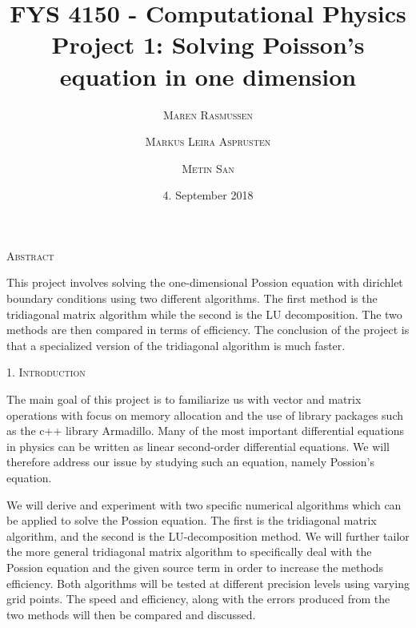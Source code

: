 \documentclass[a4paper,10pt]{article}
\title{FYS 4150 - Computational Physics\\
 Project 1: Solving Poisson's equation in one dimension 
}
\date{\normalsize{4. September 2018} }
\author{
 \textsc{\small{Maren Rasmussen}}\and \textsc{\small{Markus Leira Asprusten}}\and \textsc{\small{Metin San}}
 }
\begin{document}
\maketitle
\begin{center}
\textsc{Abstract}
\end{center}

\begin{adjustwidth}{7mm}{7mm}

This project involves solving the one-dimensional Possion equation with dirichlet boundary conditions using two different algorithms. The first method is the tridiagonal matrix algorithm while the second is the LU decomposition. The two methods are then compared in terms of efficiency. The conclusion of the project is that a specialized version of the tridiagonal algorithm is much faster.

\end{adjustwidth}



\bigskip

\begin{center}
\textsc{1. Introduction}
\end{center}
The main goal of this project is to familiarize us with vector and matrix operations with focus on memory allocation and the use of library packages such as the c++ library Armadillo.
Many of the most important differential equations in physics can be written as linear second-order differential equations. We will therefore address our issue by studying such an equation, namely Possion's equation. 

We will derive and experiment with two specific numerical algorithms which can be applied to solve the Possion equation. The first is the tridiagonal matrix algorithm, and the second is the LU-decomposition method. We will further tailor the more general tridiagonal matrix algorithm to specifically deal with the Possion equation and the given source term in order to increase the methods efficiency. Both algorithms will be tested at different precision levels using varying grid points. The speed and efficiency, along with the errors produced from the two methods will then be compared and discussed.


\newpage
\end{document}
